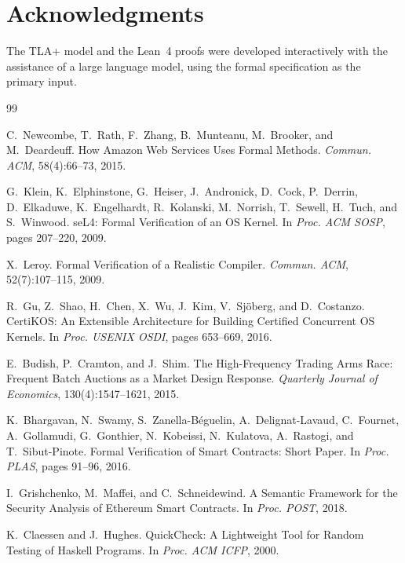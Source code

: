 \documentclass[11pt,a4paper]{article}
\begin{document}
\section*{Acknowledgments}

The TLA+ model and the Lean~4 proofs were developed interactively with
the assistance of a large language model, using the formal specification
as the primary input.

\begin{thebibliography}{99}

C.~Newcombe, T.~Rath, F.~Zhang, B.~Munteanu, M.~Brooker, and M.~Deardeuff.
How Amazon Web Services Uses Formal Methods.
\emph{Commun. ACM}, 58(4):66--73, 2015.

G.~Klein, K.~Elphinstone, G.~Heiser, J.~Andronick, D.~Cock, P.~Derrin,
D.~Elkaduwe, K.~Engelhardt, R.~Kolanski, M.~Norrish, T.~Sewell, H.~Tuch,
and S.~Winwood.
seL4: Formal Verification of an OS Kernel.
In \emph{Proc. ACM SOSP}, pages 207--220, 2009.

X.~Leroy.
Formal Verification of a Realistic Compiler.
\emph{Commun. ACM}, 52(7):107--115, 2009.

R.~Gu, Z.~Shao, H.~Chen, X.~Wu, J.~Kim, V.~Sj\"oberg, and D.~Costanzo.
CertiKOS: An Extensible Architecture for Building Certified
Concurrent OS Kernels.
In \emph{Proc. USENIX OSDI}, pages 653--669, 2016.

E.~Budish, P.~Cramton, and J.~Shim.
The High-Frequency Trading Arms Race: Frequent Batch Auctions as a
Market Design Response.
\emph{Quarterly Journal of Economics}, 130(4):1547--1621, 2015.

K.~Bhargavan, N.~Swamy, S.~Zanella-B\'eguelin, A.~Delignat-Lavaud,
C.~Fournet, A.~Gollamudi, G.~Gonthier, N.~Kobeissi, N.~Kulatova,
A.~Rastogi, and T.~Sibut-Pinote.
Formal Verification of Smart Contracts: Short Paper.
In \emph{Proc. PLAS}, pages 91--96, 2016.

I.~Grishchenko, M.~Maffei, and C.~Schneidewind.
A Semantic Framework for the Security Analysis of Ethereum Smart
Contracts.
In \emph{Proc. POST}, 2018.

K.~Claessen and J.~Hughes.
QuickCheck: A Lightweight Tool for Random Testing of Haskell Programs.
In \emph{Proc. ACM ICFP}, 2000.


\end{thebibliography}
\end{document}
